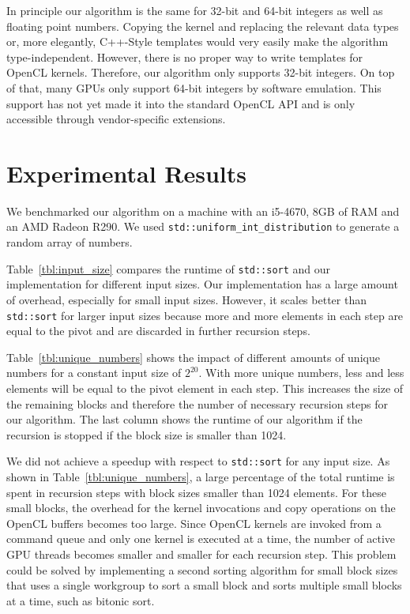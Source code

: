 \documentclass{llncs}
\begin{document}
In principle our algorithm is the same for 32-bit and 64-bit integers as well as floating point numbers. Copying the kernel and replacing the relevant data types or, more elegantly, C++-Style templates would very easily make the algorithm type-independent. However, there is no proper way to write templates for OpenCL kernels. Therefore, our algorithm only supports 32-bit integers. On top of that, many GPUs only support 64-bit integers by software emulation. This support has not yet made it into the standard OpenCL API and is only accessible through vendor-specific extensions.

\section{Experimental Results}

We benchmarked our algorithm on a machine with an i5-4670, 8GB of RAM and an AMD Radeon R290. We used \texttt{std::uniform\_int\_distribution} to generate a random array of numbers.

Table~\ref{tbl:input_size} compares the runtime of \texttt{std::sort} and our implementation for different input sizes. Our implementation has a large amount of overhead, especially for small input sizes. However, it scales better than \texttt{std::sort} for larger input sizes because more and more elements in each step are equal to the pivot and are discarded in further recursion steps.

Table~\ref{tbl:unique_numbers} shows the impact of different amounts of unique numbers for a constant input size of $2^{20}$. With more unique numbers, less and less elements will be equal to the pivot element in each step. This increases the size of the remaining blocks and therefore the number of necessary recursion steps for our algorithm. The last column shows the runtime of our algorithm if the recursion is stopped if the block size is smaller than 1024.

We did not achieve a speedup with respect to \texttt{std::sort} for any input size. As shown in Table~\ref{tbl:unique_numbers}, a large percentage of the total runtime is spent in recursion steps with block sizes smaller than 1024 elements. For these small blocks, the overhead for the kernel invocations and copy operations on the OpenCL buffers becomes too large. Since OpenCL kernels are invoked from a command queue and only one kernel is executed at a time, the number of active GPU threads becomes smaller and smaller for each recursion step. This problem could be solved by implementing a second sorting algorithm for small block sizes that uses a single workgroup to sort a small block and sorts multiple small blocks at a time, such as bitonic sort. 
\end{document}

